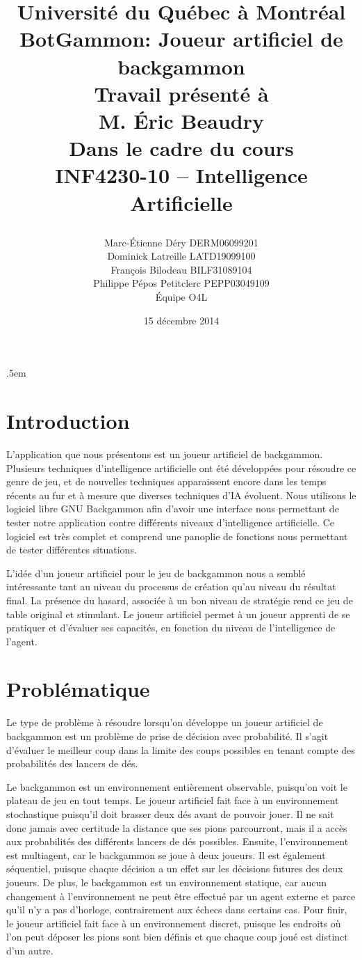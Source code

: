\documentclass{article}
\title{
\Large{Université du Québec à Montréal}\\
\vspace{3cm}
\huge{BotGammon: Joueur artificiel de backgammon}\\
\vspace{3cm}
\Large{Travail présenté à \\M. Éric Beaudry} \\
\vspace{1.5cm}
\Large{Dans le cadre du cours \\INF4230-10 – Intelligence Artificielle} \\
\vspace{1cm}
\author{Marc-Étienne Déry DERM06099201\\Dominick Latreille LATD19099100\\François Bilodeau BILF31089104\\Philippe Pépos Petitclerc PEPP03049109\\Équipe O4L}
\date{\vspace{0.5cm} 15 décembre 2014}
\vfill
}
\begin{document}
\maketitle

\thispagestyle{empty}
\clearpage

\openup .5em

\section{Introduction}
L’application que nous présentons est un joueur artificiel de backgammon.
Plusieurs techniques d’intelligence artificielle ont été développées pour
résoudre ce genre de jeu, et de nouvelles techniques apparaissent encore dans
les temps récents au fur et à mesure que diverses techniques d’IA évoluent. Nous
utilisons le logiciel libre GNU Backgammon afin d’avoir une interface nous
permettant de tester notre application contre différents niveaux d’intelligence
artificielle. Ce logiciel est très complet et comprend une panoplie de fonctions
nous permettant de tester différentes situations.

L’idée d’un joueur artificiel pour le jeu de backgammon nous a semblé
intéressante tant au niveau du processus de création qu’au niveau du résultat
final. La présence du hasard, associée à un bon niveau de stratégie rend ce jeu
de table original et stimulant. Le joueur artificiel permet à un joueur apprenti
de se pratiquer et d’évaluer ses capacités, en fonction du niveau de
l’intelligence de l’agent.

\section{Problématique}
Le type de problème à résoudre lorsqu’on développe un joueur artificiel de
backgammon est un problème de prise de décision avec probabilité. Il s’agit
d’évaluer le meilleur coup dans la limite des coups possibles en tenant compte
des probabilités des lancers de dés. 

Le backgammon est un environnement entièrement observable, puisqu’on voit le
plateau de jeu en tout temps. Le joueur artificiel fait face à un environnement
stochastique puisqu’il doit brasser deux dés avant de pouvoir jouer. Il ne sait
donc jamais avec certitude la distance que ses pions parcourront, mais il a
accès aux probabilités des différents lancers de dés possibles. Ensuite,
l’environnement est multiagent, car le backgammon se joue à deux joueurs. Il est
également séquentiel, puisque chaque décision a un effet sur les décisions
futures des deux joueurs. De plus, le backgammon est un environnement statique,
car aucun changement à l’environnement ne peut être effectué par un agent
externe et parce qu’il n’y a pas d’horloge, contrairement aux échecs dans
certains cas. Pour finir, le  joueur artificiel fait face à un environnement
discret, puisque les endroits où l’on peut déposer les pions sont bien définis
et que chaque coup joué est distinct d’un autre.
\end{document}
